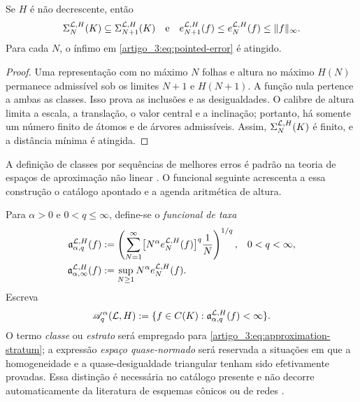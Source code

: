 \begin{proposition}\label{map:artigo_3:3.1}
\label{artigo_3:prop:schedule-nesting}
Se $H$ é não decrescente, então
\begin{equation}
 \Sigma_N^{\mathcal{L},H}(K)
 \subseteq\Sigma_{N+1}^{\mathcal{L},H}(K)
 \quad\text{e}\quad
 e_{N+1}^{\mathcal{L},H}(f)\le e_N^{\mathcal{L},H}(f)\le\|f\|_\infty.
 \label{artigo_3:eq:schedule-nesting}
\end{equation}
Para cada $N$, o ínfimo em \eqref{artigo_3:eq:pointed-error} é atingido.
\end{proposition}

\begin{proof}
Uma representação com no máximo $N$ folhas e altura no máximo $H(N)$
permanece admissível sob os limites $N+1$ e $H(N+1)$. A função nula pertence
a ambas as classes. Isso prova as inclusões e as desigualdades. O calibre de
altura limita a escala, a translação, o valor central e a inclinação; portanto, há
somente um número finito de átomos e de árvores admissíveis. Assim,
$\Sigma_N^{\mathcal{L},H}(K)$ é finito, e a distância mínima é atingida.
\end{proof}

A definição de classes por sequências de melhores erros é padrão na teoria de
espaços de aproximação não linear \citep{artigo_1-devore1998}. O funcional seguinte
acrescenta a essa construção o catálogo apontado e a agenda aritmética de
altura.

Para $\alpha>0$ e $0<q\le\infty$, define-se o \emph{funcional de taxa}
\begin{align}
 \mathfrak a_{\alpha,q}^{\mathcal{L},H}(f)
 &:=\left(\sum_{N=1}^{\infty}
       \bigl[N^\alpha e_N^{\mathcal{L},H}(f)\bigr]^q\frac1N
       \right)^{1/q}, &&0<q<\infty,
 \label{artigo_3:eq:rate-functional-finite}\\
 \mathfrak a_{\alpha,\infty}^{\mathcal{L},H}(f)
 &:=\sup_{N\ge1}N^\alpha e_N^{\mathcal{L},H}(f).
 \label{artigo_3:eq:rate-functional-infty}
\end{align}
Escreva
\begin{equation}
 \mathscr A_{q}^{\alpha}(\mathcal{L},H)
 :=\{f\in C(K):\mathfrak a_{\alpha,q}^{\mathcal{L},H}(f)<\infty\}.
 \label{artigo_3:eq:approximation-stratum}
\end{equation}
O termo \emph{classe} ou \emph{estrato} será empregado para
\eqref{artigo_3:eq:approximation-stratum}; a expressão \emph{espaço quase-normado} será reservada
a situações em que a homogeneidade e a quase-desigualdade triangular tenham sido efetivamente
provadas. Essa distinção é necessária no catálogo presente e não decorre
automaticamente da literatura de esquemas cônicos ou de redes
\citep{artigo_2-gribonval2022,artigo_2-grohs2023}.

